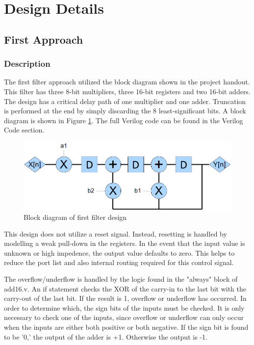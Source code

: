 \section*{Design Details}
\subsection*{First Approach}
\subsubsection*{Description}
The first filter approach utilized the block diagram shown in the project handout. This filter has three 8-bit multipliers, three 16-bit registers and two 16-bit adders. The design has a critical delay path of one multiplier and one adder. Truncation is performed at the end by simply discarding the 8 least-significant bits. A block diagram is shown in Figure \ref{fig:block1}. The full Verilog code can be found in the Verilog Code section.

\begin{figure}[h]
\begin{center}
\includegraphics[scale=0.5]{block_one.png}
\end{center}
\caption{Block diagram of first filter design}
\label{fig:block1}
\end{figure}



This design does not utilize a reset signal. Instead, resetting is handled by modelling a weak pull-down in the registers. In the event that the input value is unknown or high impedence, the output value defaults to zero. This helps to reduce the port list and also internal routing required for this control signal. 

The overflow/underflow is handled by the logic found in the "always" block of add16.v. An if statement checks the XOR of the carry-in to the last bit with the carry-out of the last bit. If the result is 1, overflow or underflow has occurred. In order to determine which, the sign bits of the inputs must be checked. It is only necessary to check one of the inputs, since overflow or underflow can only occur when the inputs are either both positive or both negative. If the sign bit is found to be '0,' the output of the adder is +1. Otherwise the output is -1.

